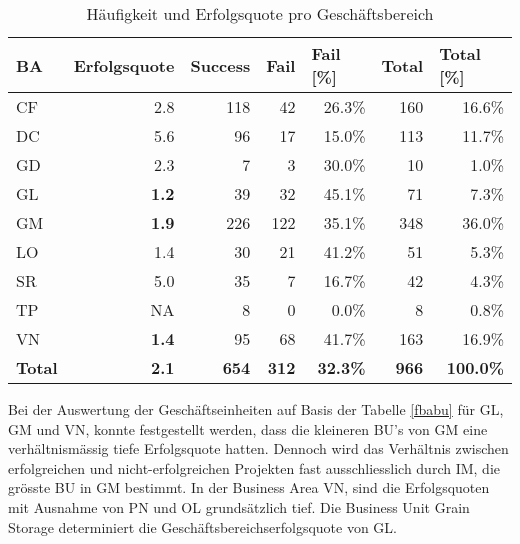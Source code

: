 \begin{table}[H]
	\centering
	\caption{Häufigkeit und Erfolgsquote pro Geschäftsbereich}
	\begin{tabular}{lrrrrrr}
		\textbf{BA}   & \multicolumn{1}{l}{\textbf{Erfolgsquote}} & \multicolumn{1}{l}{\textbf{Success}} & \multicolumn{1}{l}{\textbf{Fail}} & \multicolumn{1}{l}{\textbf{Fail [\%]}} & \multicolumn{1}{l}{\textbf{Total}} & \multicolumn{1}{l}{\textbf{Total [\%]}} \\ \hline
		CF    & 2.8   & 118   & 42    & 26.3\% & 160   & 16.6\% \\
		DC    & 5.6   & 96    & 17    & 15.0\% & 113   & 11.7\% \\
		GD    & 2.3   & 7     & 3     & 30.0\% & 10    & 1.0\% \\
		GL    & \textbf{1.2}  & 39    & 32    & 45.1\% & 71    & 7.3\% \\
		GM    & \textbf{1.9}   & 226   & 122   & 35.1\% & 348   & 36.0\% \\
		LO    & 1.4   & 30    & 21    & 41.2\% & 51    & 5.3\% \\
		SR    & 5.0   & 35    & 7     & 16.7\% & 42    & 4.3\% \\
		TP    & NA      & 8     & 0     & 0.0\% & 8     & 0.8\% \\
		VN    & \textbf{1.4}   & 95    & 68    & 41.7\% & 163   & 16.9\% \\\hline
		\textbf{Total } & \textbf{2.1} & \textbf{654} & \textbf{312} & \textbf{32.3\%} & \textbf{966} & \textbf{100.0\%} \\
	\end{tabular}%
	\label{fba}%
\end{table}%
Bei der Auswertung der Geschäftseinheiten auf Basis der Tabelle \ref{fbabu} für GL, GM und VN, konnte festgestellt werden, dass die kleineren BU's von GM eine verhältnismässig tiefe Erfolgsquote hatten. Dennoch wird das Verhältnis zwischen erfolgreichen und nicht-erfolgreichen Projekten fast ausschliesslich durch IM, die grösste BU in GM bestimmt. In der Business Area VN, sind die Erfolgsquoten mit Ausnahme von PN und OL grundsätzlich tief. Die Business Unit Grain Storage determiniert die Geschäftsbereichserfolgsquote von GL.
